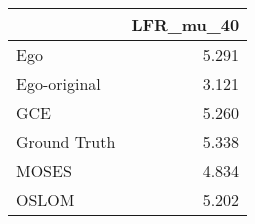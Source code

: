 \begin{tabular}{lr}
\toprule
{} & LFR_mu_40 \\
\midrule
Ego          &     5.291 \\
Ego-original &     3.121 \\
GCE          &     5.260 \\
Ground Truth &     5.338 \\
MOSES        &     4.834 \\
OSLOM        &     5.202 \\
\bottomrule
\end{tabular}
